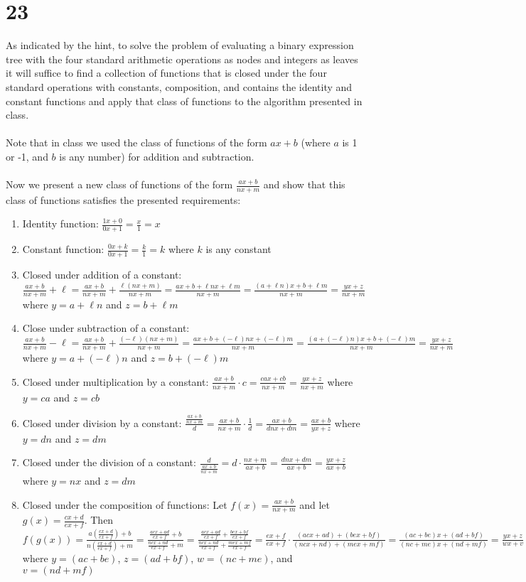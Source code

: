 \documentclass[letterpaper,notitlepage,twoside]{article}
\begin{document}
\section*{23}
As indicated by the hint, to solve the problem of evaluating a binary expression tree with the four standard arithmetic operations as nodes and integers as leaves it will suffice to find a collection of functions that is closed under the four standard operations with constants, composition, and contains the identity and constant functions and apply that class of functions to the algorithm presented in class. \\\\
Note that in class we used the class of functions of the form $ax+b$ (where $a$ is 1 or -1, and $b$ is any number) for addition and subtraction. \\\\
Now we present a new class of functions of the form $\frac{ax+b}{nx+m}$ and show that this class of functions satisfies the presented requirements:
\begin{enumerate}
  \item Identity function: $\frac{1x+0}{0x+1} = \frac{x}{1} = x$
  \item Constant function: $\frac{0x+k}{0x+1} = \frac{k}{1} = k$ where $k$ is any constant
  \item Closed under addition of a constant: $\frac{ax+b}{nx+m} + \ell = \frac{ax+b}{nx+m} + \frac{\ell (nx+m)}{nx+m} = \frac{ax+b+\ell nx+\ell m}{nx+m} = \frac{(a+\ell n)x+b+\ell m}{nx+m} = \frac{yx+z}{nx+m}$ where $y = a + \ell n$ and $z = b + \ell m$
  \item Close under subtraction of a constant: $\frac{ax+b}{nx+m} - \ell = \frac{ax+b}{nx+m} + \frac{(-\ell) (nx+m)}{nx+m} = \frac{ax+b+(-\ell) nx+(-\ell) m}{nx+m} = \frac{(a+(-\ell) n)x+b+(-\ell) m}{nx+m} = \frac{yx+z}{nx+m}$ where $y = a + (-\ell) n$ and $z = b + (-\ell) m$
  \item Closed under multiplication by a constant: $\frac{ax+b}{nx+m} \cdot c = \frac{cax+cb}{nx+m} = \frac{yx+z}{nx+m}$ where $y=ca$ and $z=cb$
  \item Closed under division by a constant: $\frac{\frac{ax+b}{nx+m}}{d} = \frac{ax+b}{nx+m} \cdot \frac{1}{d} = \frac{ax+b}{dnx+dm}  = \frac{ax+b}{yx+z}$ where $y = dn$ and $z = dm$
  \item Closed under the division of a constant: $\frac{d}{\frac{ax+b}{nx+m}} = d \cdot \frac{nx+m}{ax+b} = \frac{dnx+dm}{ax+b} = \frac{yx+z}{ax+b}$ where $y = nx$ and $z = dm$
  \item Closed under the composition of functions: Let $f(x) = \frac{ax+b}{nx+m}$ and let $g(x) = \frac{cx+d}{ex+f}$. Then $f(g(x)) = \frac{a(\frac{cx+d}{ex+f})+b}{n(\frac{cx+d}{ex+f})+m} = \frac{\frac{acx+ad}{ex+f}+b}{\frac{ncx+nd}{ex+f}+m} = \frac{\frac{acx+ad}{ex+f}+\frac{bex+bf}{ex+f}}{\frac{ncx+nd}{ex+f}+\frac{mex+mf}{ex+f}} = \frac{ex+f}{ex+f} \cdot \frac{(acx+ad)+(bex+bf)}{(ncx+nd)+(mex+mf)} = \frac{(ac+be)x+(ad+bf)}{(nc+me)x+(nd+mf)} = \frac{yx+z}{wx+v}$ where $y = (ac+be)$, $z = (ad+bf)$, $w = (nc+me)$, and $v = (nd + mf)$
\end{enumerate}
\end{document}

